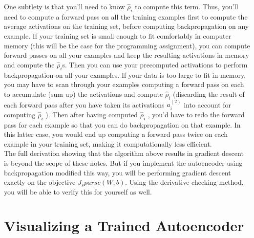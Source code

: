 \documentclass[conference]{IEEEtran}
\begin{document}
One subtlety is that you’ll need to know $\hat{\rho}_i$ to compute this term. 
Thus, you’ll need to compute a 
forward pass on all the training examples first to 
compute the average activations on the training set, 
before computing backpropagation on any example. 
If your training set is small enough to fit comfortably in computer memory 
(this will be the case for the programming assignment), 
you can compute forward passes on all your examples 
and keep the resulting activations in memory and compute the $\hat{\rho}_i$s.
Then you can use your precomputed activations to perform backpropagation on all your examples. If your data is too large to fit in memory, you may have to scan through your examples computing a 
forward pass on each to accumulate (sum up) the activations and compute $\hat{\rho}_i$ (discarding the result 
of each forward pass after you have taken its activations $\hat{a}_i^{(2)}$ into account for computing $\hat{\rho}_i$
). Then after having computed $\hat{\rho}_i$ , you’d have to redo the forward pass for each example so that you can do backpropagation on that example. In this latter case, you would end up computing a 
forward pass twice on each example in your training set, 
making it computationally less efficient.\\
The full derivation showing that the algorithm above results 
in gradient descent is beyond the scope of these notes.
But if you implement the autoencoder 
using backpropagation modified this way, 
you will be performing gradient descent exactly on the
objective $J_sparse(W,b)$. Using the derivative checking method, you will be able to verify this for yourself as well.

\section{Visualizing a Trained Autoencoder}
\end{document}

